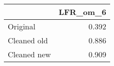 \begin{tabular}{lr}
\toprule
{} & LFR_om_6 \\
\midrule
Original    &    0.392 \\
Cleaned old &    0.886 \\
Cleaned new &    0.909 \\
\bottomrule
\end{tabular}
